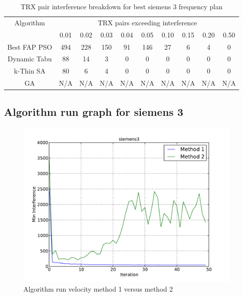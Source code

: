 \begin{table}[H]
\centering
	\begin{tabular}{cccccccccc}
	\toprule
    Algorithm & \multicolumn{9}{c}{TRX pairs exceeding interference}\\
    & 0.01 & 0.02 & 0.03 & 0.04 & 0.05 & 0.10 & 0.15 & 0.20 & 0.50 \\
    \midrule
    Best FAP PSO & 494 & 228 & 150 & 91 & 146 & 27 & 6 & 4 & 0 \\
    Dynamic Tabu & 88 & 14 & 3 & 0 & 0 & 0 & 0 & 0 & 0\\
    k-Thin SA & 80 & 6 & 4 & 0 & 0 & 0 & 0 & 0 & 0\\
    GA & \scriptsize{N/A} & \scriptsize{N/A} & \scriptsize{N/A} & \scriptsize{N/A} & \scriptsize{N/A} & \scriptsize{N/A} & \scriptsize{N/A} & \scriptsize{N/A} & \scriptsize{N/A}\\
    \bottomrule
	\end{tabular}
\caption{TRX pair interference breakdown for best siemens 3 frequency plan}
\label{tab:breakdown-siem3m1}
\end{table}

\subsection{Algorithm run graph for siemens 3}
\begin{figure}[H]
	\begin{centering}
    \includegraphics[scale=0.5]{../Implementation/data-cruncher/graph/siemens3.pdf}
	\caption{Algorithm run velocity method 1 versus method 2}
	\label{fig:siem3graph}
	\end{centering}
\end{figure}



